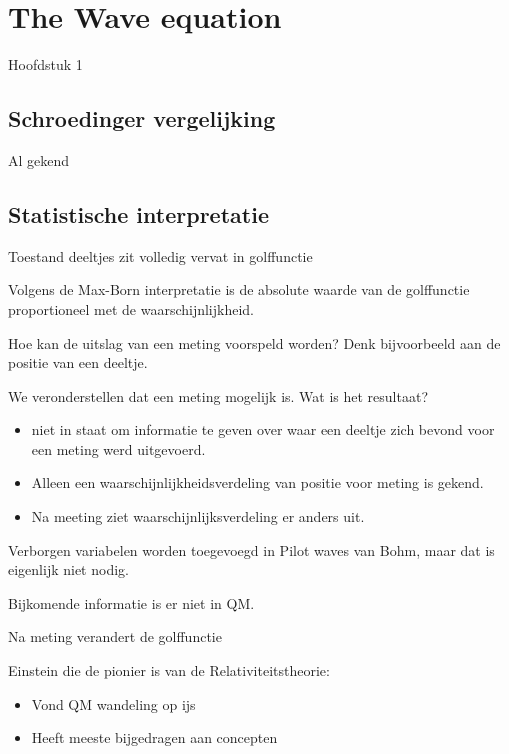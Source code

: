 \documentclass[dutch,course]{lecture}
\begin{document}
\section{The Wave equation}
Hoofdstuk 1

\subsection*{Schroedinger vergelijking}

Al gekend

\subsection*{Statistische interpretatie}

Toestand deeltjes zit volledig vervat in golffunctie


Volgens de Max-Born interpretatie is de absolute waarde van de golffunctie proportioneel met de waarschijnlijkheid.

Hoe kan de uitslag van een meting voorspeld worden? Denk bijvoorbeeld aan de  positie van een deeltje.

We veronderstellen dat een meting mogelijk is. Wat is het resultaat?

\begin{itemize}

\item
  niet in staat om informatie te geven over waar een deeltje zich bevond
  voor een meting werd uitgevoerd.
\item
  Alleen een waarschijnlijkheidsverdeling van positie voor meting is
  gekend.
\item
  Na meeting ziet waarschijnlijksverdeling er anders uit.
\end{itemize}

Verborgen variabelen worden toegevoegd in Pilot waves van Bohm, maar dat
is eigenlijk niet nodig.

Bijkomende informatie is er niet in QM.

Na meting verandert de golffunctie

Einstein die de pionier is van de Relativiteitstheorie:

\begin{itemize}

\item
  Vond QM wandeling op ijs
\item
  Heeft meeste bijgedragen aan concepten
\end{itemize}
\end{document}
